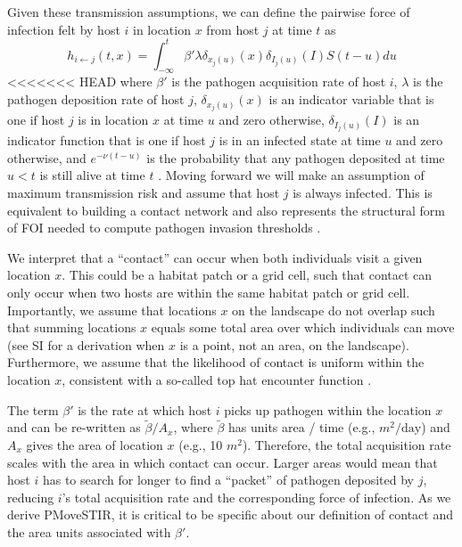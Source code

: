 \documentclass[letterpaper]{article}
\begin{document}
Given these transmission assumptions, we can define the pairwise force of infection felt by host $i$ in location $x$ from host $j$ at time $t$ as \citep{Wilber2022}
\begin{equation}
    h_{i \leftarrow j}(t, x) = \int_{-\infty}^{t} \beta' \lambda \delta_{x_j(u)}(x) \delta_{I_j(u)}(I) S(t - u) du
    \label{eq:original_foi}
\end{equation}
<<<<<<< HEAD
where $\beta'$ is the pathogen acquisition rate of host $i$, $\lambda$ is the pathogen deposition rate of host $j$, $\delta_{x_j(u)}(x)$ is an indicator variable that is one if host $j$ is in location $x$ at time $u$ and zero otherwise, $\delta_{I_j(u)}(I)$ is an indicator function that is one if host $j$ is in an infected state at time $u$ and zero otherwise, and $e^{-\nu(t - u)}$ is the probability that any pathogen deposited at time $u < t$ is still alive at time $t$ \citep[see][for a full derivation]{Wilber2022}.  Moving forward we will make an assumption of maximum transmission risk and assume that host $j$ is always infected. This is equivalent to building a contact network and also represents the structural form of FOI needed to compute pathogen invasion thresholds \citep{Wilber2022}.

We interpret that a ``contact'' can occur when both individuals visit a given location $x$. This could be a habitat patch or a grid cell, such that contact can only occur when two hosts are within the same habitat patch or grid cell. 
Importantly, we assume that locations $x$ on the landscape do not overlap such that summing locations $x$ equals some total area over which individuals can move (see SI for a derivation when $x$ is a point, not an area, on the landscape). Furthermore, we assume that the likelihood of contact is uniform within the location $x$, consistent with a so-called top hat encounter function \citep{Gurarie2013,Wilber2022}.

The term $\beta'$ is the rate at which host $i$ picks up pathogen within the location $x$ and can be re-written as $\tilde{\beta} / A_x$, where $\tilde{\beta}$ has units area / time (e.g., $m^2 / \text{day}$) and $A_x$ gives the area of location $x$ (e.g., 10 $m^2$). Therefore, the total acquisition rate scales with the area in which contact can occur. Larger areas would mean that host $i$ has to search for longer to find a ``packet'' of pathogen deposited by $j$, reducing $i$'s total acquisition rate and the corresponding force of infection.
As we derive PMoveSTIR, it is critical to be specific about our definition of contact and the area units associated with $\beta'$.  
\end{document}
